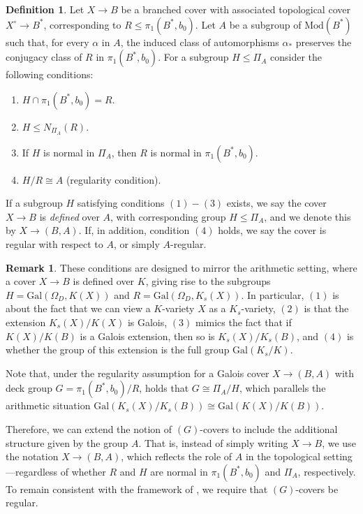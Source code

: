\documentclass[10pt]{amsart}
\theoremstyle{definition}
\newtheorem{remark}[theorem]{Remark}
\newtheorem{definition}[theorem]{Definition}
\newcommand{\Gal}{{ \mathrm{Gal}}}
\begin{document}
\begin{definition} \label{def:topological_defined}
Let $X\rightarrow B$ be a branched cover with associated topological cover $X^\circ \rightarrow B^*$, corresponding to $R\leq \pi_1(B^*,b_0)$. Let $A$ be a subgroup of $\mathrm{Mod}(B^*)$ such that, for every $\alpha $ in $A$, the induced class of automorphisms $\alpha_*$ preserves the conjugacy class of $R$ in $\pi_1(B^*,b_0)$. For a subgroup $H \leq \Pi_A$ consider the following conditions:
\begin{enumerate}
\item $H\cap \pi_1(B^*,b_0) = R$.
\item $H \leq N_{\Pi_A}(R)$.
\item If $H$ is normal in $\Pi_A$, then $R$ is normal in $\pi_1(B^*,b_0)$.
\item $H/R \cong A$ (regularity condition).
\end{enumerate}
If a subgroup $H$ satisfying conditions $(1)-(3)$ exists, we say the cover $X\rightarrow B$ is {\em defined} over $A$, with corresponding group $H\leq \Pi_A$, and we denote this by $X\rightarrow (B,A)$. 
If, in addition, condition $(4)$ holds, we say the cover is regular with respect to $A$, or simply $A$-regular.

\end{definition}

\begin{remark}
These conditions are designed to mirror the arithmetic setting, where a cover $X\rightarrow B$ is defined over $K$, giving rise to the subgroups $H=\Gal(\Omega_D,K(X))$ and $R=\Gal(\Omega_D,K_s(X))$. 
In particular, $(1)$ is about the fact that we can view a $K$-variety $X$ as a $K_s$-variety, $(2)$ is that the extension $K_s(X)/K(X)$ is Galois, $(3)$ mimics the fact that if $K(X)/K(B)$ is a Galois extension, then so is $K_s(X)/K_s(B)$, and $(4)$ is whether the group of this extension is the full group $\Gal(K_s/K)$.

Note that, under the regularity assumption for a Galois cover $X\rightarrow (B,A)$ with deck group $G = \pi_1(B^*,b_0)/R$, holds that $G\cong \Pi_A/H$, which parallels the arithmetic situation $\Gal(K_s(X)/K_s(B)) \cong \Gal(K(X)/K(B))$.
\end{remark}

Therefore, we can extend the notion of $(G)$-covers to include the additional structure given by the group $A$. That is, instead of simply writing $ X\rightarrow B$, we use the notation $X\rightarrow (B,A)$, which reflects the role of $A$ in the topological setting—regardless of whether $R$ and $H$ are normal in $\pi_1(B^*,b_0)$ and $\Pi_A$, respectively. To remain consistent with the framework of \cite{DebesDouai97}, we require that
$(G)$-covers be regular.
\end{document}

